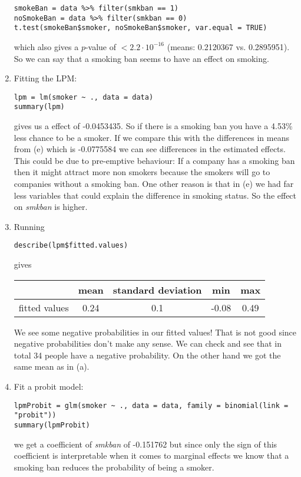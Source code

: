 \documentclass{article}
\begin{document}
\begin{enumerate}[label=(\alph*)]
		\begin{lstlisting}
smokeBan = data %>% filter(smkban == 1)
noSmokeBan = data %>% filter(smkban == 0)
t.test(smokeBan$smoker, noSmokeBan$smoker, var.equal = TRUE)	
		\end{lstlisting}
		which also gives a $p$-value of  $<2.2\cdot 10^{-16}$ (means: 0.2120367 vs. 0.2895951). So we can say that a smoking ban seems to have an effect on smoking.
		\item Fitting the LPM:
		\begin{lstlisting}
lpm = lm(smoker ~ ., data = data)
summary(lpm)
		\end{lstlisting}
		gives us a effect of -0.0453435. So if there is a smoking ban you have a 4.53\% less chance to be a smoker. If we compare this with the differences in means from (e) which is -0.0775584 we can see differences in the estimated effects. This could be due to pre-emptive behaviour: If a company has a smoking ban then it might attract more non smokers because the smokers will go to companies without a smoking ban. One other reason is that in (e) we had far less variables that could explain the difference in smoking status. So the effect on \textit{smkban} is higher.
		\item Running
		\begin{lstlisting}
describe(lpm$fitted.values)
		\end{lstlisting}
		gives
		\begin{center}
			\begin{tabular}{l|cccc}
				& \textbf{mean} & \textbf{standard deviation} & \textbf{min} & \textbf{max} \\
				\hline
				fitted values & 0.24 & 0.1 & -0.08 & 0.49
			\end{tabular}
		\end{center}
		We see some negative probabilities in our fitted values! That is not good since negative probabilities don't make any sense. We can check and see that in total 34 people have a negative probability. On the other hand we got the same mean as in (a).
		\item Fit a probit model:
		\begin{lstlisting}
lpmProbit = glm(smoker ~ ., data = data, family = binomial(link = "probit"))
summary(lpmProbit)
		\end{lstlisting}
		we get a coefficient of \textit{smkban} of -0.151762 but since only the sign of this coefficient is interpretable when it comes to marginal effects we know that a smoking ban reduces the probability of being a smoker.

\end{enumerate}
\end{document}
